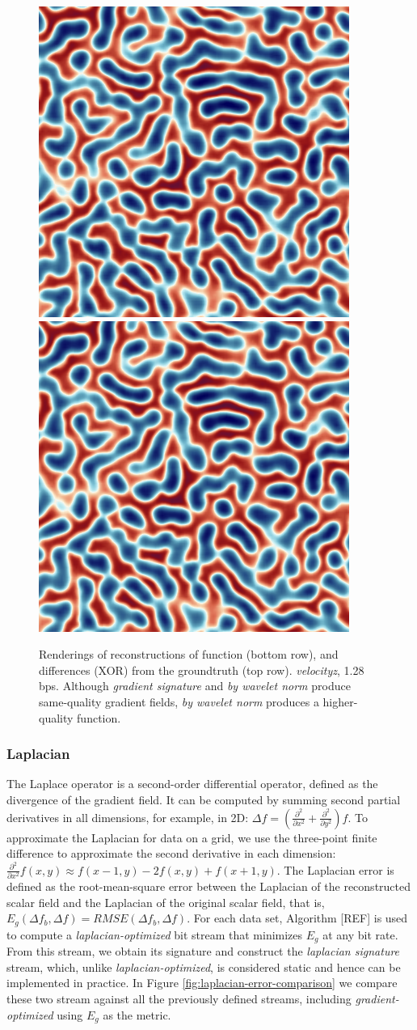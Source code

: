 \begin{figure}[h]
	{\includegraphics[width=0.24\linewidth]{img/laplacian/curr_func2-laplacian-signature.png}}
	{\includegraphics[width=0.24\linewidth]{img/laplacian/curr_func3-laplacian-optimized.png}}
	\caption{Renderings of reconstructions of function (bottom row), and differences (XOR) from the groundtruth (top row). \emph{velocityz}, 1.28 bps. Although \emph{gradient signature} and \emph{by wavelet norm} produce same-quality gradient fields, \emph{by wavelet norm} produces a higher-quality function.}
  \label{fig:gradient-rendering}
\end{figure}

\subsubsection{Laplacian}
\label{sec:laplacian}

The Laplace operator is a second-order differential operator, defined as the divergence of the
gradient field. It can be computed by summing second partial derivatives in all dimensions, for
example, in 2D: $\Delta f=(\frac{{\partial}^2}{\partial{x^2}}+\frac{{\partial}^2}{\partial{y^2}})f$.
To approximate the Laplacian for data on a grid, we use the three-point finite difference to
approximate the second derivative in each dimension: $\frac{{\partial}^2}{\partial{x^2}}f(x,y)
\approx f(x-1,y)-2f(x,y)+f(x+1,y)$. The Laplacian error is defined as the root-mean-square error
between the Laplacian of the reconstructed scalar field and the Laplacian of the original scalar
field, that is, $E_g(\Delta f_b,\Delta f)=RMSE(\Delta f_b,\Delta f)$. For each data set, Algorithm
[REF] is used to compute a \emph{laplacian-optimized} bit stream that minimizes $E_g$ at any bit
rate. From this stream, we obtain its signature and construct the \emph{laplacian signature} stream,
which, unlike \emph{laplacian-optimized}, is considered static and hence can be implemented in
practice. In Figure \ref{fig:laplacian-error-comparison} we compare these two stream against all the
previously defined streams, including \emph{gradient-optimized} using $E_g$ as the metric.

